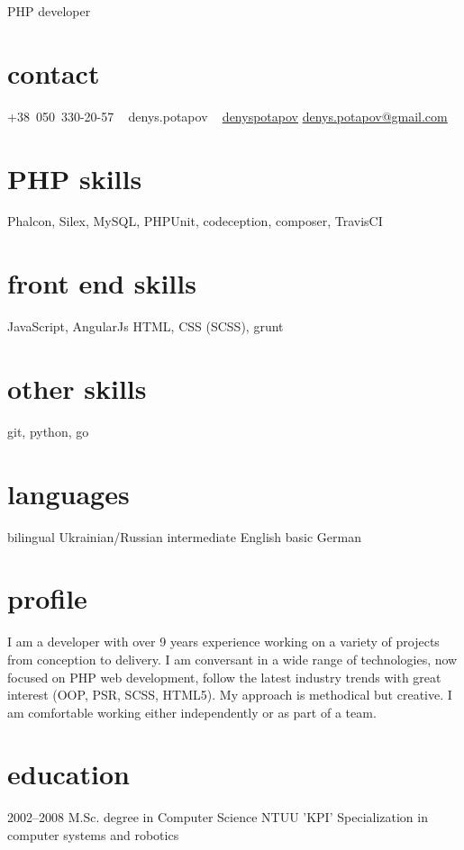 \documentclass[hidelinks,a4paper]{cv}
\providecommand\faSkype{{\FA\symbol{"F17E}}}
\begin{document}
       {PHP developer}


\begin{aside}
  \section{contact}
     +38~050~330-20-57
     \faSkype~ denys.potapov
     \faLinkedin~ \href{https://www.linkedin.com/in/denyspotapov}{denyspotapov}
     \href{mailto:denys.potapov@gmail.com}{denys.potapov@gmail.com}
  \section{PHP skills}
    Phalcon, Silex, MySQL,
    PHPUnit, codeception,
    composer, TravisCI
  \section{front end skills}
    JavaScript, AngularJs
    HTML, CSS (SCSS), grunt
  \section{other skills}
    git, python, go
  \section{languages}
    bilingual Ukrainian/Russian
    intermediate English
    basic German
\end{aside}

\section{profile}
I am a developer with over 9 years experience working on a variety of projects from conception to delivery. I am conversant in a wide range of technologies, now focused on PHP web development, follow the latest industry trends with great interest (OOP, PSR, SCSS, HTML5). My approach is methodical but creative. I am comfortable working either independently or as part of a team.
\section{education}

\begin{entrylist}
  \entry
    {2002–2008}
    {M.Sc. degree in Computer Science}
    {NTUU 'KPI'}
    {Specialization in computer systems and robotics}
\end{entrylist}
\end{document}
